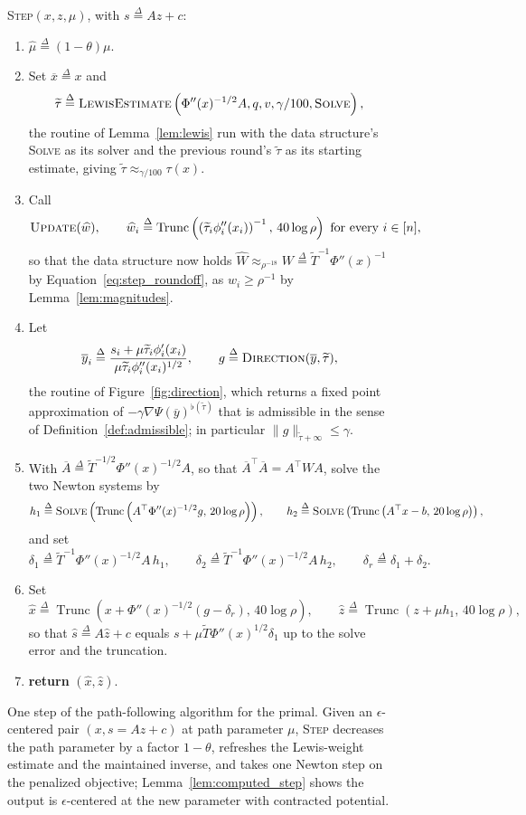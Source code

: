 \documentclass[11pt]{article}
\newcommand{\Trunc}{\operatorname{Trunc}}
\newcommand{\what}{\widehat{w}}
\newcommand{\xhat}{\widehat{x}}
\newcommand{\shat}{\widehat{s}}
\newcommand{\zhat}{\widehat{z}}
\newcommand{\muhat}{\widehat{\mu}}
\newcommand{\tautil}{\widetilde{\tau}}
\newcommand{\defeq}{\stackrel{\Delta}{=}}
\newenvironment{fminipage}%
  {\begin{Sbox}\begin{minipage}}%
  {\end{minipage}\end{Sbox}\fbox{\TheSbox}}
\newenvironment{algbox}[0]{\vskip 0.2in
\noindent 
\begin{fminipage}{6.3in}
}{
\end{fminipage}
\vskip 0.2in
}
\begin{document}
\begin{figure}[H]
\begin{algbox}
\textsc{Step}$(x, z, \mu)$, with
$s \defeq A z + c$:
\begin{enumerate}
\item $\muhat \defeq (1 - \theta) \mu$.
\item Set $\overline{x} \defeq x$ and
\[
\tautil
\defeq
\textsc{LewisEstimate}\left(
\Phi''(x)^{-1/2} A, q, v, \gamma / 100, \textsc{Solve}
\right),
\]
the routine of Lemma~\ref{lem:lewis} run with the data structure's
\textsc{Solve} as its solver and the previous round's $\tautil$ as its starting
estimate, giving $\tautil \approx_{\gamma / 100} \tau(x)$.
\item Call
\[
\textsc{Update}(\what),
\qquad
\what_i
\defeq
\Trunc\left(
\left( \tautil_i \phi_i''(x_i) \right)^{-1}, \, 40 \log \rho
\right)
\text{ for every } i \in [n] ,
\]
so that the data structure now holds
$\widehat W \approx_{\rho^{-18}} W \defeq \widetilde{T}^{-1} \Phi''(x)^{-1}$ by
Equation~\eqref{eq:step_roundoff}, as $w_i \ge \rho^{-1}$ by
Lemma~\ref{lem:magnitudes}.
\item Let
\[
\overline{y}_i
\defeq
\frac{s_i + \mu \tautil_i \phi_i'(x_i)}
{\mu \tautil_i \phi_i''(x_i)^{1/2}},
\qquad
g \defeq \textsc{Direction}(\overline{y}, \tautil),
\]
the routine of Figure~\ref{fig:direction}, which returns a fixed point
approximation of $- \gamma \nabla \Psi(\overline{y})^{\flat(\tautil)}$ that is
admissible in the sense of Definition~\ref{def:admissible}; in particular
$\|g\|_{\tautil + \infty} \le \gamma$.
\item With $\overline{A} \defeq \widetilde{T}^{-1/2} \Phi''(x)^{-1/2} A$, so
  that $\overline{A}^\top \overline{A} = A^\top W A$, solve the two Newton
  systems by
\[
h_1
\defeq
\textsc{Solve}\left(
\Trunc\left( A^\top \Phi''(x)^{-1/2} g, \, 20 \log \rho \right) \right),
\qquad
h_2
\defeq
\textsc{Solve}\left(
\Trunc\left( A^\top x - b, \, 20 \log \rho \right) \right),
\]
and set
\[
\delta_1
\defeq
\widetilde{T}^{-1} \Phi''(x)^{-1/2} A \, h_1,
\qquad
\delta_2
\defeq
\widetilde{T}^{-1} \Phi''(x)^{-1/2} A \, h_2,
\qquad
\delta_r \defeq \delta_1 + \delta_2 .
\]
\item Set
\[
\xhat \defeq \Trunc\left( x + \Phi''(x)^{-1/2} (g - \delta_r), \, 40 \log \rho \right),
\qquad
\zhat \defeq \Trunc\left( z + \mu h_1, \, 40 \log \rho \right),
\]
so that $\shat \defeq A \zhat + c$ equals
$s + \mu \widetilde{T} \Phi''(x)^{1/2} \delta_1$ up to the solve error and the
truncation.
\item \textbf{return} $(\xhat, \zhat)$.
\end{enumerate}
\end{algbox}
\caption{One step of the path-following algorithm for the primal.
Given an $\epsilon$-centered pair
$(x, s = A z + c)$ at path parameter
$\mu$, \textsc{Step} decreases the path parameter by a factor
$1 - \theta$, refreshes the Lewis-weight estimate and the maintained
inverse, and takes one Newton step on the penalized objective;
Lemma~\ref{lem:computed_step} shows the output is $\epsilon$-centered at
the new parameter with contracted potential.}
\label{fig:step}
\end{figure}
\end{document}

